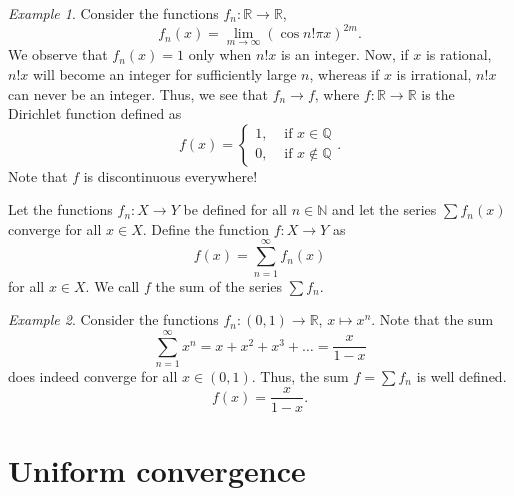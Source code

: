 \documentclass[11pt]{article}
\def\R{\mathbb{R}}
\def\Q{\mathbb{Q}}
\theoremstyle{definition}
\theoremstyle{remark}
\newtheorem*{example}{Example}
\numberwithin{equation}{module}
\begin{document}
    \begin{example}
        Consider the functions $f_n\colon \R \to \R$, \[
            f_n(x) = \lim_{m \to \infty} (\cos{n!\pi x})^{2m}.
        \] We observe that $f_n(x) = 1$ only when $n!x$ is an integer.
        Now, if $x$ is rational, $n!x$ will become an integer for sufficiently large
        $n$, whereas if $x$ is irrational, $n!x$ can never be an integer. Thus,
        we see that $f_n \to f$, where $f\colon \R \to \R$ is the Dirichlet
        function defined as \[
            f(x) = \begin{cases}
                1, &\text{ if } x \in \Q \\
                0, &\text{ if } x \notin \Q
            \end{cases}.
        \] 
        Note that $f$ is discontinuous everywhere!
    \end{example}
    
    \begin{definition}
        Let the functions $f_n\colon X \to Y$ be defined for all $n \in \mathbb{N}$
        and let the series $\sum f_n(x)$ converge for all $x \in X$.
        Define the function $f\colon X \to Y$ as \[
            f(x) = \sum_{n = 1}^\infty f_n(x)
        \] for all $x \in X$. We call $f$ the sum of the series $\sum f_n$.
    \end{definition}
    \begin{example}
        Consider the functions $f_n\colon (0, 1) \to \R$, $x \mapsto x^n$.
        Note that the sum \[
            \sum_{n = 1}^{\infty} x^n = x + x^2 + x^3 + \dots 
                = \frac{x}{1 - x} 
        \] does indeed converge for all $x \in (0, 1)$. Thus, the sum $f = \sum f_n$
        is well defined. \[
            f(x) = \frac{x}{1 - x}.
        \] 
    \end{example}

    
    \section{Uniform convergence}
    
\end{document}
